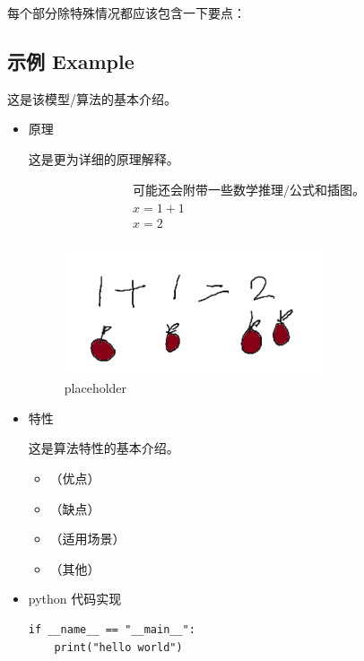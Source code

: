 \documentclass{article}
\begin{document}
每个部分除特殊情况都应该包含一下要点：

\subsection{示例 Example}

这是该模型/算法的基本介绍。

\begin{itemize}

\item{原理}

这是更为详细的原理解释。

\begin{equation}
    \begin{split}
        &\text{可能还会附带一些数学推理/公式和插图。}\\
        & x = 1 + 1 \\
        & x = 2 \\
    \end{split}
\end{equation}

\begin{figure}[H]
    \centering
    \includegraphics[width = 3in]{placeholder}
    \caption{placeholder}
    \label{fig:placeholder}
\end{figure}

\item{特性}

这是算法特性的基本介绍。

\begin{itemize}
    \item （优点）
    \item （缺点）
    \item （适用场景）
    \item （其他）
\end{itemize}

\item{python 代码实现}

\begin{verbatim}
if __name__ == "__main__":
    print("hello world")
\end{verbatim}

\end{itemize}
\end{document}
